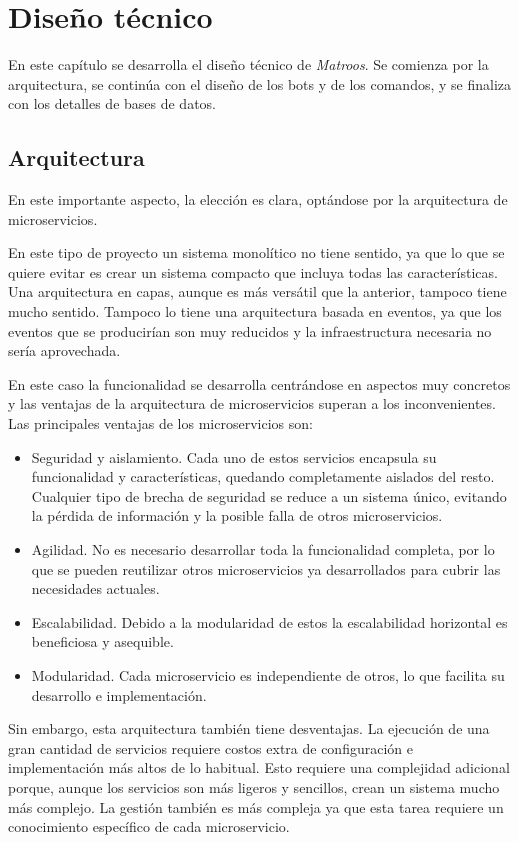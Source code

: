 \chapter{Diseño técnico}
\label{cap:5}
 
En este capítulo se desarrolla el diseño técnico de \textit{Matroos}. Se comienza por la arquitectura, se continúa con el diseño de los bots y de los comandos, y se finaliza con los detalles de bases de datos.

\section{Arquitectura}

En este importante aspecto, la elección es clara, optándose por la arquitectura de microservicios.

En este tipo de proyecto un sistema monolítico no tiene sentido, ya que lo que se quiere evitar es crear un sistema compacto que incluya todas las características. Una arquitectura en capas, aunque es más versátil que la anterior, tampoco tiene mucho sentido. Tampoco lo tiene una arquitectura basada en eventos, ya que los eventos que se producirían son muy reducidos y la infraestructura necesaria no sería aprovechada.

En este caso la funcionalidad se desarrolla centrándose en aspectos muy concretos y las ventajas de la arquitectura de microservicios superan a los inconvenientes. Las principales ventajas de los microservicios son:

\begin{itemize}
	\item Seguridad y aislamiento. Cada uno de estos servicios encapsula su funcionalidad y características, quedando completamente aislados del resto. Cualquier tipo de brecha de seguridad se reduce a un sistema único, evitando la pérdida de información y la posible falla de otros microservicios.
	\item Agilidad. No es necesario desarrollar toda la funcionalidad completa, por lo que se pueden reutilizar otros microservicios ya desarrollados para cubrir las necesidades actuales.
	\item Escalabilidad. Debido a la modularidad de estos la escalabilidad horizontal es beneficiosa y asequible.
	\item Modularidad. Cada microservicio es independiente de otros, lo que facilita su desarrollo e implementación.
\end{itemize}

Sin embargo, esta arquitectura también tiene desventajas. La ejecución de una gran cantidad de servicios requiere costos extra de configuración e implementación más altos de lo habitual. Esto requiere una complejidad adicional porque, aunque los servicios son más ligeros y sencillos, crean un sistema mucho más complejo. La gestión también es más compleja ya que esta tarea requiere un conocimiento específico de cada microservicio.

